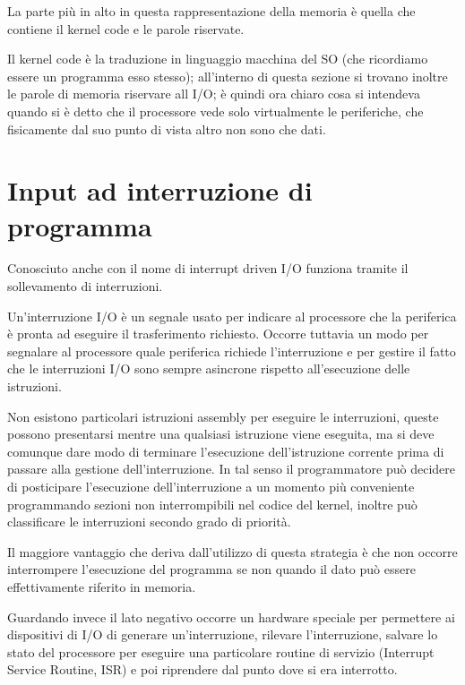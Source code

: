 \documentclass[class=book, crop=false, oneside]{standalone}
\begin{document}
La parte più in alto in questa rappresentazione della memoria è quella che contiene il kernel code e le parole riservate.

Il kernel code è la traduzione in linguaggio macchina del SO (che ricordiamo essere un programma esso stesso); all'interno di questa sezione si trovano inoltre le parole di memoria riservare all I/O; è quindi ora chiaro cosa si intendeva quando si è detto che il processore vede solo virtualmente le periferiche, che fisicamente dal suo punto di vista altro non sono che dati.

\section{Input ad interruzione di programma}
Conosciuto anche con il nome di interrupt driven I/O funziona tramite il sollevamento di interruzioni.

Un’interruzione I/O è un segnale usato per indicare al processore che la periferica è pronta ad eseguire il trasferimento richiesto.
Occorre tuttavia un modo per segnalare al processore quale periferica richiede l’interruzione e per gestire il fatto che le interruzioni I/O sono sempre asincrone rispetto all’esecuzione delle istruzioni.

Non esistono particolari istruzioni assembly per eseguire le interruzioni, queste possono presentarsi mentre una qualsiasi istruzione viene eseguita, ma si deve comunque dare modo di terminare l’esecuzione dell’istruzione corrente prima di passare alla gestione dell'interruzione.
In tal senso il programmatore può decidere di posticipare l’esecuzione dell’interruzione a un momento più conveniente programmando sezioni non interrompibili nel codice del kernel, inoltre può classificare le interruzioni secondo grado di priorità.

Il maggiore vantaggio che deriva dall'utilizzo di questa strategia è che non occorre interrompere l’esecuzione del programma se non quando il dato può essere effettivamente riferito in memoria.

Guardando invece il lato negativo occorre un hardware speciale per permettere ai dispositivi di I/O di generare un’interruzione, rilevare l’interruzione, salvare lo stato del processore per eseguire una particolare routine di servizio (Interrupt Service Routine, ISR) e poi riprendere dal punto dove si era interrotto.
\end{document}
